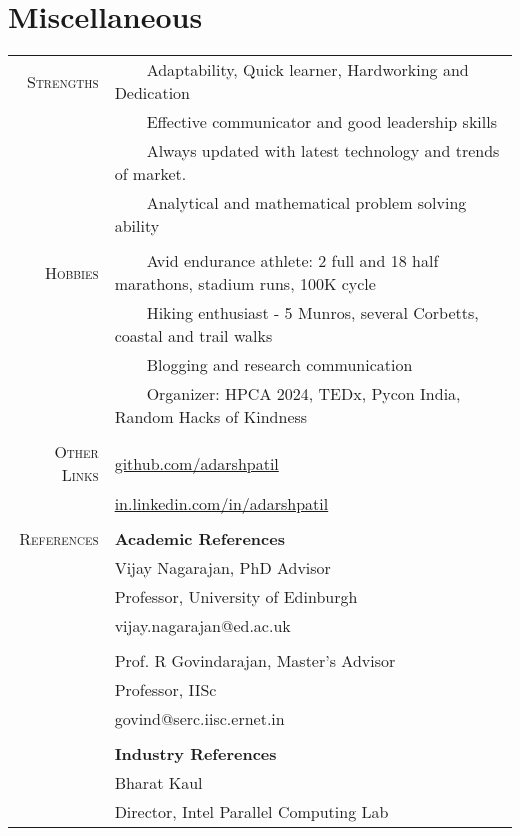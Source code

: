 \documentclass[a4paper,10pt]{article} %
\newcommand{\tabitem}{~~\llap{\textbullet}~~}
\begin{document}

\section{Miscellaneous}
\begin{tabular}{rl}
\textsc{Strengths} & \tabitem Adaptability, Quick learner, Hardworking and Dedication\\
& \tabitem Effective communicator and good leadership skills \\
& \tabitem Always updated with latest technology and trends of market.\\
& \tabitem Analytical and mathematical problem solving ability \\
& \\
\textsc{Hobbies} & \tabitem Avid endurance athlete: 2 full and 18 half marathons, stadium runs, 100K cycle\\
& \tabitem Hiking enthusiast - 5 Munros, several Corbetts, coastal and trail walks\\
& \tabitem Blogging and research communication \\
& \tabitem Organizer:  HPCA 2024, TEDx, Pycon India, Random Hacks of Kindness\\
& \\
\textsc{Other Links} & \href{https://github.com/adarshpatil}{github.com/adarshpatil} \\
& \href{https://in.linkedin.com/in/adarshpatil}{in.linkedin.com/in/adarshpatil}\\
&\\
\textsc{References} & \textbf{Academic References} \\
& Vijay Nagarajan, PhD Advisor \\
& Professor, University of Edinburgh\\
& vijay.nagarajan@ed.ac.uk \\
&\\
& Prof. R Govindarajan, Master's Advisor \\
& Professor, IISc\\
& govind@serc.iisc.ernet.in \\
&\\

& \textbf{Industry References} \\
& Bharat Kaul \\
& Director, Intel Parallel Computing Lab \\
\end{tabular}
\end{document}
